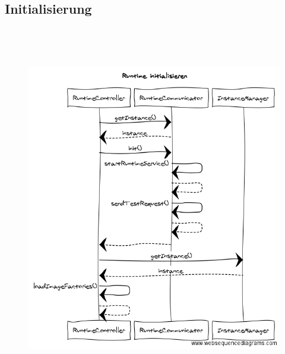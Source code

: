 \documentclass[a4paper,20pt,oneside]{book}
\begin{document}
	\subsection{Initialisierung}
	\begin{figure}[!hb]
    \includegraphics[width=18cm,height=16cm]{runtimeInit}
\end{figure}
\newpage
\end{document}
